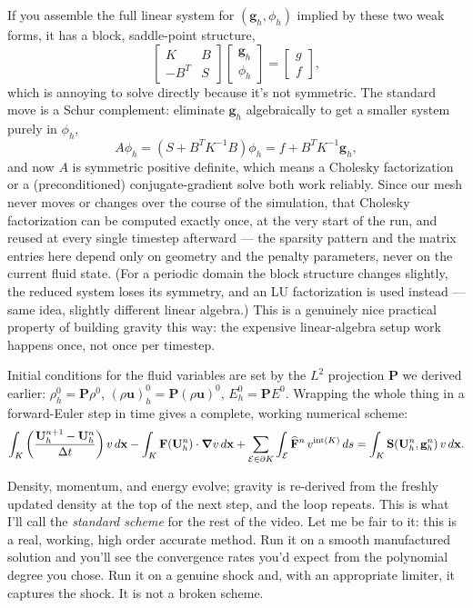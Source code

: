 If you assemble the full linear system for $(\mathbf{g}_h, \phi_h)$ implied by these two weak forms, it has a block, saddle-point structure,
\[
	\begin{bmatrix} K & B \\ -B^T & S \end{bmatrix}
	\begin{bmatrix} \mathbf{g}_h \\ \phi_h \end{bmatrix}
	=
	\begin{bmatrix} g \\ f \end{bmatrix},
\]
which is annoying to solve directly because it's not symmetric. The standard move is a Schur complement: eliminate $\mathbf{g}_h$ algebraically to get a smaller system purely in $\phi_h$,
\[
	A\phi_h = \left(S + B^T K^{-1} B\right)\phi_h = f + B^T K^{-1}\mathbf{g}_h,
\]
and now $A$ is symmetric positive definite, which means a Cholesky factorization or a (preconditioned) conjugate-gradient solve both work reliably. Since our mesh never moves or changes over the course of the simulation, that Cholesky factorization can be computed exactly once, at the very start of the run, and reused at every single timestep afterward — the sparsity pattern and the matrix entries here depend only on geometry and the penalty parameters, never on the current fluid state. (For a periodic domain the block structure changes slightly, the reduced system loses its symmetry, and an LU factorization is used instead — same idea, slightly different linear algebra.) This is a genuinely nice practical property of building gravity this way: the expensive linear-algebra setup work happens once, not once per timestep.

Initial conditions for the fluid variables are set by the $L^2$ projection $\mathbf{P}$ we derived earlier: $\rho_h^0 = \mathbf{P}\rho^0$, $(\rho\mathbf{u})_h^0 = \mathbf{P}(\rho\mathbf{u})^0$, $E_h^0 = \mathbf{P}E^0$. Wrapping the whole thing in a forward-Euler step in time gives a complete, working numerical scheme:
\[
	\int_K \left(\frac{\mathbf{U}_h^{n+1}-\mathbf{U}_h^n}{\Delta t}\right) v\, d\mathbf{x} - \int_K \mathbf{F}(\mathbf{U}_h^n)\cdot\grad v\, d\mathbf{x} + \sum_{\mathcal{E}\in\partial K}\int_{\mathcal{E}} \widehat{\mathbf{F}}^n \, v^{\mathrm{int}(K)}\, ds = \int_K \mathbf{S}(\mathbf{U}_h^n,\mathbf{g}_h^n)\, v\, d\mathbf{x}.
\]

Density, momentum, and energy evolve; gravity is re-derived from the freshly updated density at the top of the next step, and the loop repeats. This is what I'll call the \emph{standard scheme} for the rest of the video. Let me be fair to it: this is a real, working, high order accurate method. Run it on a smooth manufactured solution and you'll see the convergence rates you'd expect from the polynomial degree you chose. Run it on a genuine shock and, with an appropriate limiter, it captures the shock. It is not a broken scheme.

